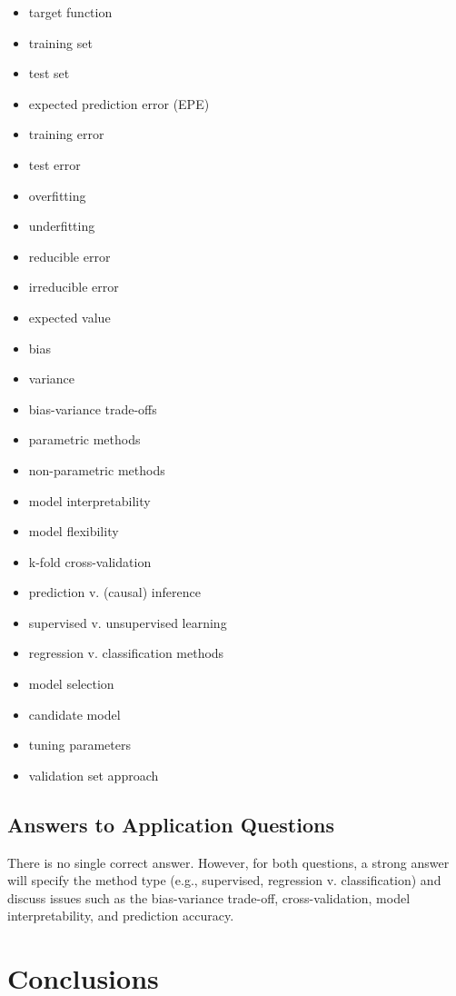 \documentclass{book}
\providecommand{\tightlist}{%
  \setlength{\itemsep}{0pt}\setlength{\parskip}{0pt}}
\begin{document}
\begin{itemize}
\tightlist
\item
  target function
\item
  training set
\item
  test set
\item
  expected prediction error (EPE)
\item
  training error
\item
  test error
\item
  overfitting
\item
  underfitting
\item
  reducible error
\item
  irreducible error
\item
  expected value
\item
  bias
\item
  variance
\item
  bias-variance trade-offs
\item
  parametric methods
\item
  non-parametric methods
\item
  model interpretability
\item
  model flexibility
\item
  k-fold cross-validation
\item
  prediction v. (causal) inference
\item
  supervised v. unsupervised learning
\item
  regression v. classification methods
\item
  model selection
\item
  candidate model
\item
  tuning parameters
\item
  validation set approach
\end{itemize}

\hypertarget{answers-to-application-questions-6}{%
\section{Answers to Application
Questions}\label{answers-to-application-questions-6}}

There is no single correct answer. However, for both questions, a strong
answer will specify the method type (e.g., supervised, regression v.
classification) and discuss issues such as the bias-variance trade-off,
cross-validation, model interpretability, and prediction accuracy.

\hypertarget{conclusions}{%
\chapter{Conclusions}\label{conclusions}}
\end{document}

